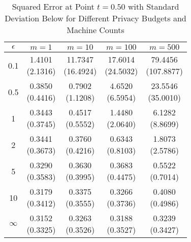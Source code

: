 \begin{table}[ht]
\centering
\begin{tabular}{ccccc}
  \toprule
$\epsilon$ & $m=1$ & $m=10$ & $m=100$ & $m=500$ \\ 
  \midrule
0.1 & \makecell{1.4101 \\ (2.1316)} & \makecell{11.7347 \\ (16.4924)} & \makecell{17.6014 \\ (24.5032)} & \makecell{79.4456 \\ (107.8877)} \\ 
  0.5 & \makecell{0.3850 \\ (0.4416)} & \makecell{0.7902 \\ (1.1208)} & \makecell{4.6520 \\ (6.5954)} & \makecell{23.5546 \\ (35.0010)} \\ 
  1 & \makecell{0.3443 \\ (0.3745)} & \makecell{0.4517 \\ (0.5552)} & \makecell{1.4480 \\ (2.0640)} & \makecell{6.1282 \\ (8.8699)} \\ 
  2 & \makecell{0.3441 \\ (0.3673)} & \makecell{0.3760 \\ (0.4216)} & \makecell{0.6343 \\ (0.8103)} & \makecell{1.8073 \\ (2.5786)} \\ 
  5 & \makecell{0.3290 \\ (0.3583)} & \makecell{0.3630 \\ (0.3995)} & \makecell{0.3683 \\ (0.4475)} & \makecell{0.5522 \\ (0.7014)} \\ 
  10 & \makecell{0.3179 \\ (0.3412)} & \makecell{0.3375 \\ (0.3555)} & \makecell{0.3266 \\ (0.3736)} & \makecell{0.4080 \\ (0.4986)} \\ 
  $\infty$ & \makecell{0.3152 \\ (0.3325)} & \makecell{0.3263 \\ (0.3526)} & \makecell{0.3188 \\ (0.3527)} & \makecell{0.3239 \\ (0.3427)} \\ 
   \bottomrule
\end{tabular}
\caption{Squared Error at Point $t=0.50$ with Standard Deviation Below for Different Privacy Budgets and Machine Counts} 
\label{tab:mse_point}
\end{table}
